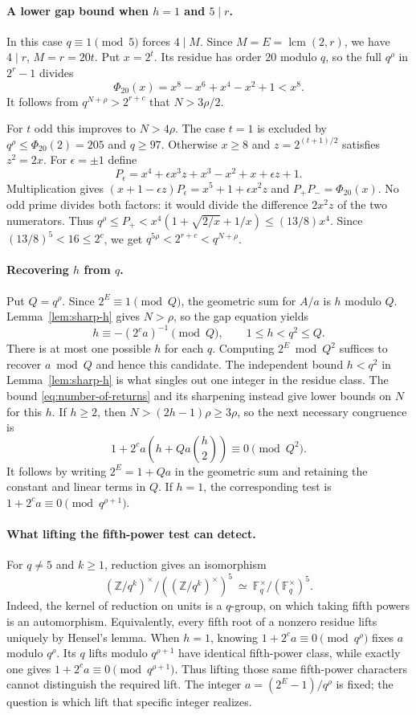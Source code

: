 \documentclass[11pt]{article}
\begin{document}
\paragraph{A lower gap bound when $h=1$ and $5\mid r$.}
In this case $q\equiv1\pmod5$ forces $4\mid M$. Since
$M=E=\operatorname{lcm}(2,r)$, we have $4\mid r$, $M=r=20t$.
Put $x=2^t$. Its residue has order $20$ modulo $q$, so the full
$q^\rho$ in $2^r-1$ divides
\[
 \Phi_{20}(x)=x^8-x^6+x^4-x^2+1<x^8.
\]
It follows from $q^{N+\rho}>2^{r+c}$ that $N>3\rho/2$.

For $t$ odd this improves to $N>4\rho$. The case $t=1$ is
excluded by $q^\rho\le\Phi_{20}(2)=205$ and $q\ge97$.
Otherwise $x\ge8$ and $z=2^{(t+1)/2}$ satisfies $z^2=2x$.
For $\epsilon=\pm1$ define
\[
 P_\epsilon=x^4+\epsilon x^3z+x^3-x^2+x+\epsilon z+1.
\]
Multiplication gives
$(x+1-\epsilon z)P_\epsilon=x^5+1+\epsilon x^2z$
and $P_+P_-=\Phi_{20}(x)$. No odd prime divides both factors:
it would divide the difference $2x^2z$ of the two numerators.
Thus $q^\rho\le P_+<x^4(1+\sqrt{2/x}+1/x)\le(13/8)x^4$.
Since $(13/8)^5<16\le2^c$, we get $q^{5\rho}<2^{r+c}<q^{N+\rho}$.

\paragraph{Recovering $h$ from $q$.}
Put $Q=q^\rho$. Since $2^E\equiv1\pmod Q$, the geometric sum for
$A/a$ is $h$ modulo $Q$. Lemma~\ref{lem:sharp-h} gives $N>\rho$,
so the gap equation yields
\[
h\equiv-(2^ca)^{-1}\pmod Q,\qquad 1\le h<q^2\le Q.
\]
There is at most one possible $h$ for each $q$. Computing
$2^E\bmod Q^2$ suffices to recover $a\bmod Q$ and hence this
candidate. The independent bound $h<q^2$ in Lemma~\ref{lem:sharp-h}
is what singles out one integer in the residue class. The bound
\eqref{eq:number-of-returns} and its sharpening instead give
lower bounds on $N$ for this $h$. If $h\ge2$, then
$N>(2h-1)\rho\ge3\rho$, so the next
necessary congruence is
\[
1+2^ca\left(h+Q a\binom h2\right)\equiv0\pmod{Q^2}.
\]
It follows by writing $2^E=1+Qa$ in the geometric sum and retaining
the constant and linear terms in $Q$. If $h=1$, the corresponding
test is $1+2^ca\equiv0\pmod{q^{\rho+1}}$.

\paragraph{What lifting the fifth-power test can detect.}
For $q\ne5$ and $k\ge1$, reduction gives an isomorphism
\[
 (\mathbb Z/q^k)^\times/((\mathbb Z/q^k)^\times)^5
 \ \simeq\ \mathbb F_q^\times/(\mathbb F_q^\times)^5 .
\]
Indeed, the kernel of reduction on units is a $q$-group, on which
taking fifth powers is an automorphism. Equivalently, every fifth
root of a nonzero residue lifts uniquely by Hensel's lemma.
When $h=1$, knowing $1+2^ca\equiv0\pmod{q^\rho}$ fixes $a$
modulo $q^\rho$. Its $q$ lifts modulo $q^{\rho+1}$ have identical
fifth-power class, while exactly one gives
$1+2^ca\equiv0\pmod{q^{\rho+1}}$. Thus lifting those same
fifth-power characters cannot distinguish the required lift.
The integer $a=(2^E-1)/q^\rho$ is fixed; the question is which
lift that specific integer realizes.
\end{document}
